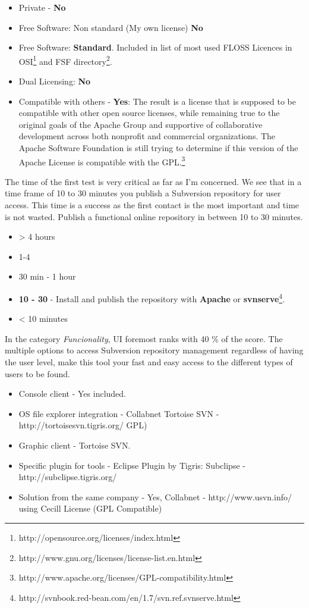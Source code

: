 \documentclass[11pt]{scrartcl}
\begin{document}
\begin{itemize} 
    \item Private - \textbf{No}
    \item Free Software: Non standard (My own license) \textbf{No}
    \item Free Software: \textbf{Standard}. Included in list of most used FLOSS Licences in OSI\footnote{http://opensource.org/licenses/index.html} and FSF directory\footnote{http://www.gnu.org/licenses/license-list.en.html}.
    \item Dual Licensing: \textbf{No}
    \item Compatible with others - \textbf{Yes}: The result is a license that is supposed to be compatible with other open source licenses, while remaining true to the original goals of the Apache Group and supportive of collaborative development across both nonprofit and commercial organizations. The Apache Software Foundation is still trying to determine if this version of the Apache License is compatible with the GPL.\footnote{http://www.apache.org/licenses/GPL-compatibility.html}
\end{itemize}

\par The time of the first test is very critical as far as I'm concerned. We see that in a time frame of 10 to 30 minutes you publish a Subversion repository for user access. This time is a success as the first contact is the most important and time is not wasted. Publish a functional online repository in between 10 to 30 minutes.

\begin{itemize}
    \item \textgreater
4 hours
    \item 1-4 
    \item 30 min - 1 hour
    \item \textbf{10 - 30} - Install and publish the repository with \textbf{Apache} or \textbf{svnserve}\footnote{http://svnbook.red-bean.com/en/1.7/svn.ref.svnserve.html}.
    \item \textless
10 minutes
\end{itemize}

\par In the category \emph{Funcionality}, UI foremost ranks with 40 \% of the score. The multiple options to access Subversion repository management regardless of having the user level, make this tool your fast and easy access to the different types of users to be found.

\begin{itemize}
    \item Console client - Yes included.
    \item OS file explorer integration - Collabnet Tortoise SVN - http://tortoisesvn.tigris.org/ GPL)
    \item Graphic client - Tortoise SVN.
    \item Specific plugin for tools - Eclipse Plugin by Tigris: Subclipse - http://subclipse.tigris.org/
    \item Solution from the same company - Yes, Collabnet - http://www.usvn.info/ using Cecill License (GPL Compatible)
\end{itemize}
\end{document}
